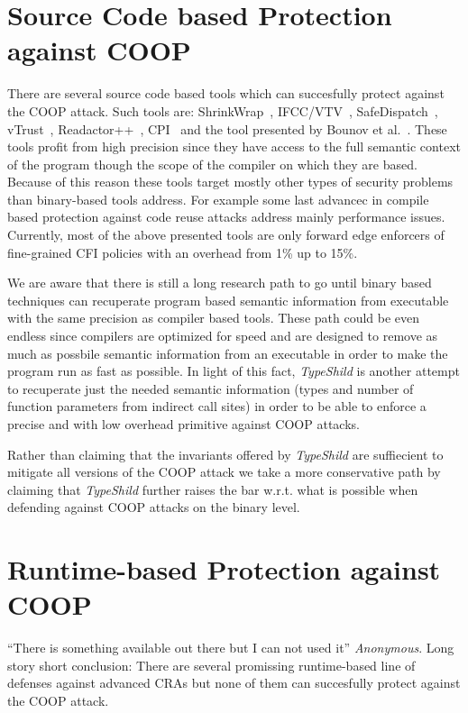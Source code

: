 \section{Source Code based Protection against COOP}
\label{Source Code based Protection agaisnt COOP}
There are several source code based tools 
which can succesfully protect against the COOP attack.
Such tools are: ShrinkWrap~\cite{haller:shrinkwrap}, IFCC/VTV~\cite{vtv:tice}, 
SafeDispatch~\cite{safedispatch:jang}, vTrust~\cite{zhang:vtrust}, Readactor++~\cite{crane:readactor++}, CPI~\cite{volodymyr:cpi} and the
tool presented by Bounov et al.~\cite{bounov:interleaving}. These tools profit from high precision
since they have access to the full semantic context of the program though the scope
of the compiler on which they are based. 
Because of this reason these tools target mostly other types of security problems than binary-based 
tools address. For example some last advancec in compile based protection against 
code reuse attacks address mainly performance issues.
Currently, most of the above presented tools are only forward
edge enforcers of fine-grained CFI policies with an overhead from 1\% up to 15\%.

We are aware that there is still a long research path to go until binary based techniques can 
recuperate program based semantic information from executable with the same precision as compiler based tools.
These path could be even endless since compilers are optimized for speed and are designed to remove as much as possbile semantic information
from an executable in order to make the program run as fast as possible. In light of this fact,
\textit{TypeShild} is another attempt to recuperate just the needed semantic information (types and number of function parameters from
indirect call sites) in order to be able to enforce a precise and with low overhead primitive against COOP attacks.

Rather than claiming that the invariants offered by \textit{TypeShild} are suffiecient
to mitigate all versions of the COOP attack we take a more conservative path by claiming that \textit{TypeShild} 
further raises the bar w.r.t. what is possible when defending against COOP attacks on the binary level.

\section{Runtime-based Protection against COOP}
\label{Runtime-based Protection against COOP}
``There is something available out there but I can not used it'' \textit{Anonymous}.
Long story short conclusion: There are several promissing runtime-based line of defenses against
advanced CRAs but none of them can succesfully protect against the COOP attack.

